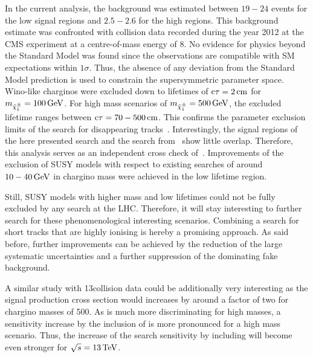 In the current analysis, the background was estimated between $19-24$ events for the low \ias signal regions and $2.5-2.6$ for the high \ias regions.
This background estimate was confronted with collision data recorded during the year 2012 at the CMS experiment at a centre-of-mass energy of 8\tev.
No evidence for physics beyond the Standard Model was found since the observations are compatible with SM expectations within $1\sigma$.
Thus, the absence of any deviation from the Standard Model prediction is used to constrain the supersymmetric parameter space.
Wino-like charginos were excluded down to lifetimes of $\text{c}\tau=2\,\text{cm}$ for $m_{\tilde{\chi}^{\pm}_{1}}=100\,\text{Ge}\kern-0.06667em\text{V}$.
For high mass scenarios of $m_{\tilde{\chi}^{\pm}_{1}}=500\,\text{Ge}\kern-0.06667em\text{V}$, the excluded lifetime ranges between $\text{c}\tau=70-500\,\text{cm}$.
This confirms the parameter exclusion limits of the search for disappearing tracks~\cite{bib:CMS:DT_8TeV}.
Interestingly, the signal regions of the here presented search and the search from~\cite{bib:CMS:DT_8TeV} show little overlap.
Therefore, this analysis serves as an independent cross check of~\cite{bib:CMS:DT_8TeV}.
Improvements of the exclusion of SUSY models with respect to existing searches of around $10-40\,\text{Ge}\kern-0.06667em\text{V}$ in chargino mass were achieved in the low lifetime region.

Still, SUSY models with higher mass and low lifetimes could not be fully excluded by any search at the LHC.
Therefore, it will stay interesting to further search for these phenomenological interesting scenarios.
Combining a search for short tracks that are highly ionising is hereby a promising approach.
As said before, further improvements can be achieved by the reduction of the large systematic uncertainties and a further suppression of the dominating fake background.

A similar study with 13\tev collision data could be additionally very interesting as the signal production cross section would increases by around a factor of two for chargino masses of 500\gev.
As \ias is much more discriminating for high masses, a sensitivity increase by the inclusion of \ias is more pronounced for a high mass scenario.
Thus, the increase of the search sensitivity by including \ias will become even stronger for $\sqrt{s} = 13\,\text{Te}\kern-0.06667em\text{V}$.


